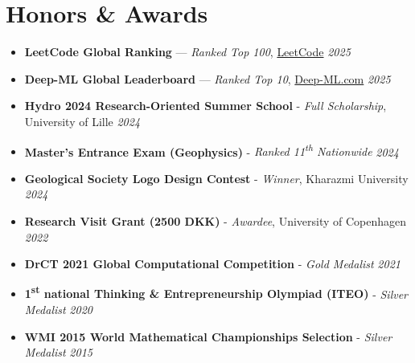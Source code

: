 \documentclass[letterpaper,11pt]{article}
\begin{document}
\section{Honors \& Awards}
\begin{itemize}[left=0pt, label={}, topsep=7.5pt,partopsep=0pt,itemsep=3.5pt,parsep=0pt]
    \item \textbf{LeetCode Global Ranking} — \textit{Ranked Top 100}, \href{https://leetcode.com/u/aradfarahani/}{LeetCode} \hfill \textit{2025}
    \item \textbf{Deep-ML Global Leaderboard} — \textit{Ranked Top 10}, \href{https://www.deep-ml.com/leaderboard}{Deep-ML.com} \hfill \textit{2025}
	\item \textbf{Hydro 2024 Research-Oriented Summer School} - \textit{Full Scholarship}, University of Lille \hfill \textit{2024}
	\item \textbf{Master's Entrance Exam (Geophysics)} - \textit{Ranked 11\textsuperscript{th} Nationwide} \hfill \textit{2024}
	\item \textbf{Geological Society Logo Design Contest} - \textit{Winner}, Kharazmi University \hfill \textit{2024}
	\item \textbf{Research Visit Grant (2500 DKK)} - \textit{Awardee}, University of Copenhagen \hfill \textit{2022}
	\item \textbf{DrCT 2021 Global Computational Competition} - \textit{Gold Medalist} \hfill \textit{2021}
	\item \textbf{1\textsuperscript{st} national Thinking \& Entrepreneurship Olympiad (ITEO)} - \textit{Silver Medalist} \hfill \textit{2020}
	\item \textbf{WMI 2015 World Mathematical Championships Selection} - \textit{Silver Medalist} \hfill \textit{2015}	
\end{itemize}
\end{document}
